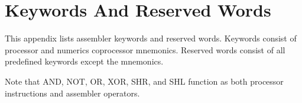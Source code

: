  

\chapter[Keywords And Reserved Words]{Keywords And Reserved Words}
This appendix lists assembler keywords and reserved words. Keywords consist of processor and numerics coprocessor mnemonics. Reserved words consist of all predefined keywords except the mnemonics.

Note that AND, NOT, OR, XOR, SHR, and SHL function as both processor instructions and assembler operators.

